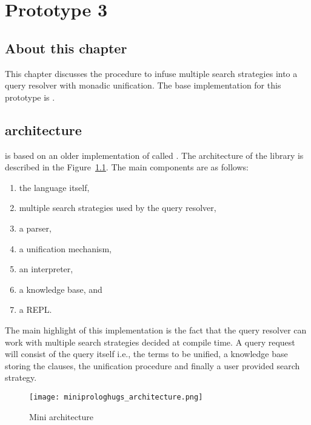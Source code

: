 \documentclass[thesis-solanki.tex]{files}
\begin{document}
\chapter{Prototype 3}{\label{proto3}}


\section{About this chapter}
This chapter discusses the procedure to infuse multiple search strategies into a  query resolver
with monadic unification.
The base implementation for this prototype is 
\cite{website:mini-prolog-hugs98}.


\section{ \cite{website:mini-prolog-hugs98} architecture}
 is based on an older implementation of  called
.
The architecture of the library is described in the Figure~\ref{fig:miniprlgarchitecture}.
The main components are as follows:

\begin{enumerate}
\item the language itself,

\item multiple search strategies used by the query resolver,

\item a parser,

\item a unification mechanism,

\item an interpreter,

\item a knowledge base, and

\item a REPL.  
\end{enumerate}

The main highlight of this implementation is the fact that the query resolver can work with multiple search
strategies decided at compile time.
A query request will consist of the query itself i.e., the terms to be unified, a knowledge base storing the
clauses, the unification procedure and finally a user provided search strategy.


\begin{figure}[H]
  \centering
  \texttt{[image: miniprologhugs\_architecture.png]}
  \caption{Mini  architecture}
  \label{fig:miniprlgarchitecture}
\end{figure}
\end{document}
